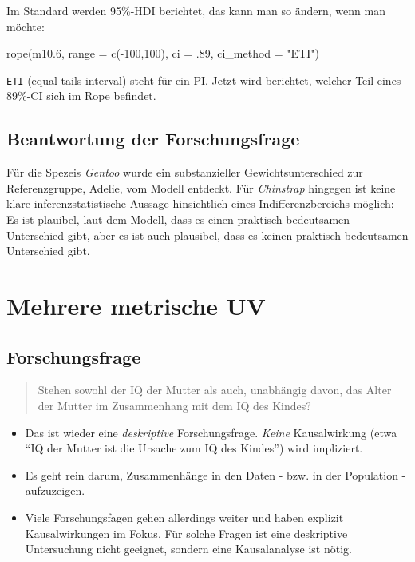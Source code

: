 \documentclass[
  a4paper,
  DIV=11]{scrreprt}
\newenvironment{Shaded}{\begin{snugshade}}{\end{snugshade}}
\newcommand{\AttributeTok}[1]{\textcolor[rgb]{0.40,0.45,0.13}{#1}}
\newcommand{\DecValTok}[1]{\textcolor[rgb]{0.68,0.00,0.00}{#1}}
\newcommand{\FloatTok}[1]{\textcolor[rgb]{0.68,0.00,0.00}{#1}}
\newcommand{\FunctionTok}[1]{\textcolor[rgb]{0.28,0.35,0.67}{#1}}
\newcommand{\NormalTok}[1]{\textcolor[rgb]{0.00,0.23,0.31}{#1}}
\newcommand{\SpecialCharTok}[1]{\textcolor[rgb]{0.37,0.37,0.37}{#1}}
\newcommand{\StringTok}[1]{\textcolor[rgb]{0.13,0.47,0.30}{#1}}
\providecommand{\tightlist}{%
  \setlength{\itemsep}{0pt}\setlength{\parskip}{0pt}}\usepackage{longtable,booktabs,array}
\theoremstyle{definition}
\theoremstyle{remark}
\begin{document}
Im Standard werden 95\%-HDI berichtet, das kann man so ändern, wenn man
möchte:

\begin{Shaded}
\begin{Highlighting}[]
\FunctionTok{rope}\NormalTok{(m10}\FloatTok{.6}\NormalTok{, }\AttributeTok{range =} \FunctionTok{c}\NormalTok{(}\SpecialCharTok{{-}}\DecValTok{100}\NormalTok{,}\DecValTok{100}\NormalTok{), }\AttributeTok{ci =}\NormalTok{ .}\DecValTok{89}\NormalTok{, }\AttributeTok{ci\_method =} \StringTok{"ETI"}\NormalTok{)}
\end{Highlighting}
\end{Shaded}

\texttt{ETI} (equal tails interval) steht für ein PI. Jetzt wird
berichtet, welcher Teil eines 89\%-CI sich im Rope befindet.

\hypertarget{beantwortung-der-forschungsfrage}{%
\subsection{Beantwortung der
Forschungsfrage}\label{beantwortung-der-forschungsfrage}}

Für die Spezeis \emph{Gentoo} wurde ein substanzieller
Gewichtsunterschied zur Referenzgruppe, Adelie, vom Modell entdeckt. Für
\emph{Chinstrap} hingegen ist keine klare inferenzstatistische Aussage
hinsichtlich eines Indifferenzbereichs möglich: Es ist plauibel, laut
dem Modell, dass es einen praktisch bedeutsamen Unterschied gibt, aber
es ist auch plausibel, dass es keinen praktisch bedeutsamen Unterschied
gibt.

\hypertarget{mehrere-metrische-uv}{%
\section{Mehrere metrische UV}\label{mehrere-metrische-uv}}

\hypertarget{forschungsfrage-3}{%
\subsection{Forschungsfrage}\label{forschungsfrage-3}}

\begin{quote}
Stehen sowohl der IQ der Mutter als auch, unabhängig davon, das Alter
der Mutter im Zusammenhang mit dem IQ des Kindes?
\end{quote}

\begin{itemize}
\tightlist
\item
  Das ist wieder eine \emph{deskriptive} Forschungsfrage. \emph{Keine}
  Kausalwirkung (etwa ``IQ der Mutter ist die Ursache zum IQ des
  Kindes'') wird impliziert.
\item
  Es geht rein darum, Zusammenhänge in den Daten - bzw. in der
  Population - aufzuzeigen.
\item
  Viele Forschungsfagen gehen allerdings weiter und haben explizit
  Kausalwirkungen im Fokus. Für solche Fragen ist eine deskriptive
  Untersuchung nicht geeignet, sondern eine Kausalanalyse ist nötig.
\end{itemize}
\end{document}
